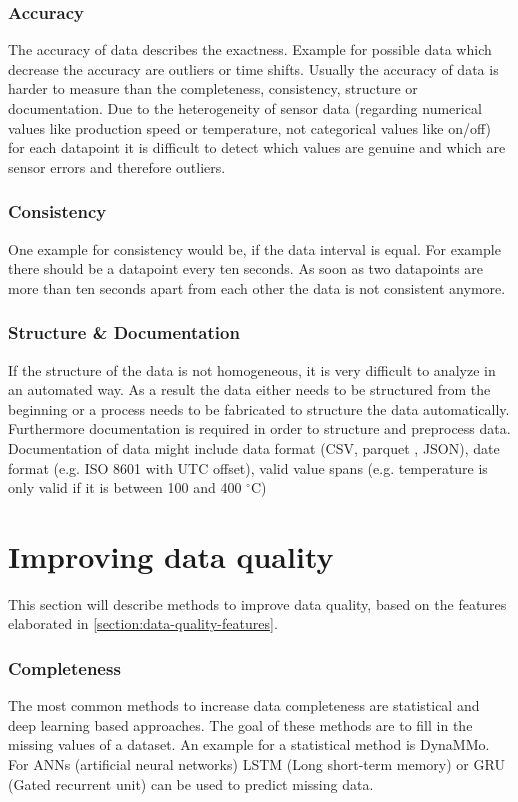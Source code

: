 \subsubsection{Accuracy}
The accuracy of data describes the exactness. Example for possible data which decrease the accuracy are outliers or time shifts. Usually the accuracy of data is harder to measure than the completeness, consistency, structure or documentation. Due to the heterogeneity of sensor data (regarding numerical values like production speed or temperature, not categorical values like on/off) for each datapoint it is difficult to detect which values are genuine and which are sensor errors and therefore outliers. \cite{caiChallengesDataQuality2015}
\subsubsection{Consistency}
One example for consistency would be, if the data interval is equal. For example there should be a datapoint every ten seconds. As soon as two datapoints are more than ten seconds apart from each other the data is not consistent anymore. \cite{caiChallengesDataQuality2015}
\subsubsection{Structure \& Documentation}
If the structure of the data is not homogeneous, it is very difficult to analyze in an automated way. As a result the data either needs to be structured from the beginning or a process needs to be fabricated to structure the data automatically. Furthermore documentation is required in order to structure and preprocess data. Documentation of data might include data format (\ac{CSV}, parquet \cite{ApacheParquet2021}, \ac{JSON}), date format (e.g. ISO 8601 with UTC offset), valid value spans (e.g. temperature is only valid if it is between 100 and 400 $^{\circ}$C)
\cite{caiChallengesDataQuality2015}

\section{Improving data quality}\label{section:imrpoving-data-quality}
This section will describe methods to improve data quality, based on the features elaborated in \autoref{section:data-quality-features}.
\subsubsection{Completeness}
The most common methods to increase data completeness are statistical and deep learning based approaches. The goal of these methods are to fill in the missing values of a dataset. An example for a statistical method is DynaMMo\cite{liDynaMMoMiningSummarization2009}. For ANNs (artificial neural networks) \ac{LSTM} (Long short-term memory) or \ac{GRU} (Gated recurrent unit) can be used to predict missing data. \cite{songIoTDataQuality2020}
